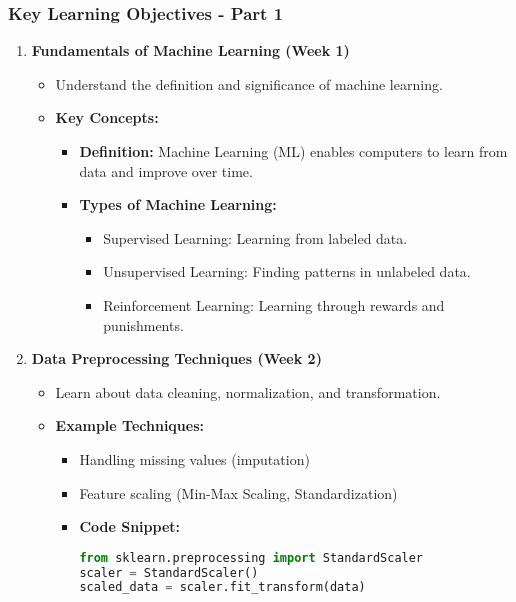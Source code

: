 \documentclass[aspectratio=169]{beamer}
\begin{document}
\begin{frame}
    \frametitle{Key Learning Objectives - Part 1}
    \begin{enumerate}
        \item \textbf{Fundamentals of Machine Learning (Week 1)}
        \begin{itemize}
            \item Understand the definition and significance of machine learning.
            \item \textbf{Key Concepts:}
            \begin{itemize}
                \item \textbf{Definition:} Machine Learning (ML) enables computers to learn from data and improve over time.
                \item \textbf{Types of Machine Learning:}
                \begin{itemize}
                    \item Supervised Learning: Learning from labeled data.
                    \item Unsupervised Learning: Finding patterns in unlabeled data.
                    \item Reinforcement Learning: Learning through rewards and punishments.
                \end{itemize}
            \end{itemize}
        \end{itemize}

        \item \textbf{Data Preprocessing Techniques (Week 2)}
        \begin{itemize}
            \item Learn about data cleaning, normalization, and transformation.
            \item \textbf{Example Techniques:}
            \begin{itemize}
                \item Handling missing values (imputation)
                \item Feature scaling (Min-Max Scaling, Standardization)
                \item \textbf{Code Snippet:}
                \begin{lstlisting}[language=Python]
from sklearn.preprocessing import StandardScaler
scaler = StandardScaler()
scaled_data = scaler.fit_transform(data)
                \end{lstlisting}
            \end{itemize}
        \end{itemize}
    \end{enumerate}
\end{frame}
\end{document}
